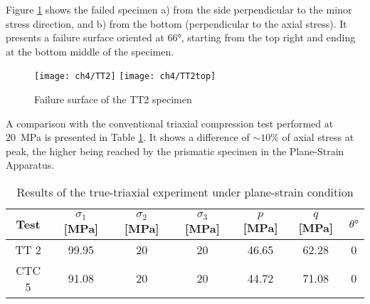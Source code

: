 Figure \ref{fig4:14} shows the failed specimen a) from the side perpendicular to the minor stress direction, and b) from the bottom (perpendicular to the axial stress). It presents a failure surface oriented at \ang{66}, starting from the top right and ending at the bottom middle of the specimen. 


\begin{figure}[tb]
    \centering
    \texttt{[image: ch4/TT2]}
    \texttt{[image: ch4/TT2top]}
    \caption{Failure surface of the TT2 specimen}
    \label{fig4:14}
\end{figure} 





A comparison with the conventional triaxial compression test performed at \SI{20}{MPa} is presented in Table \ref{tb4:TT2_CTC5}. It shows a difference of $\sim 10\%$ of axial stress at peak, the higher being reached by the prismatic specimen in the Plane-Strain Apparatus.

\begin{table}
    \centering
    \begin{tabular}{ccccccc}
        \hline
        Test & $\sigma_1$ [\si{MPa}] & $\sigma_2$ [\si{MPa}] & $\sigma_3$ [\si{MPa}] & $p$ [\si{MPa}] & $q$ [\si{MPa}] & $\theta \si{\degree}$ \\
        \hline
        \hline
        TT 2 & 99.95 & 20 & 20 & 46.65 & 62.28 & 0\\
        CTC 5 & 91.08 & 20 & 20 & 44.72 & 71.08 & 0 \\
        \hline
    \end{tabular}
    \caption{Results of the true-triaxial experiment under plane-strain condition}
    \label{tb4:TT2_CTC5}
\end{table}

